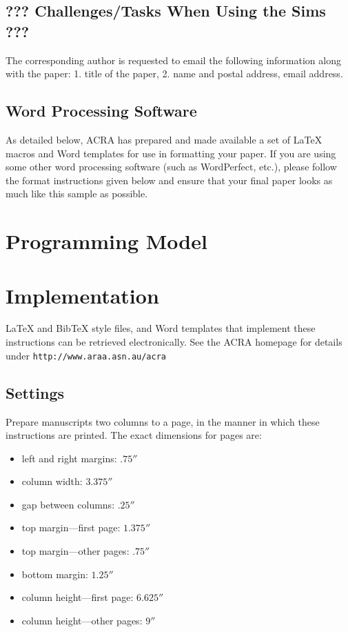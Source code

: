 \documentclass{article}
\begin{document}
\subsection{??? Challenges/Tasks When Using the Sims ???} 
The corresponding author is requested to email the following
information along with the paper: 1. title of the paper, 
2. name and postal address, email address.

\subsection{Word Processing Software}

As detailed below, ACRA has prepared and made available a set of
\LaTeX{} macros and Word templates for use in formatting your paper.
If you are using some other word processing software (such as
WordPerfect, etc.), please follow the format instructions given below
and ensure that your final paper looks as much like this sample as
possible.

\section{Programming Model}


\section{Implementation}

\LaTeX{} and Bib\TeX{} style files, and Word templates that implement these 
instructions can be retrieved electronically.  See the ACRA homepage for 
details under
\verb+http://www.araa.asn.au/acra+

\subsection{Settings}

Prepare manuscripts two columns to a page, in the manner in which these
instructions are printed.  The exact dimensions for pages are:
\begin{itemize}
\item left and right margins: $.75''$
\item column width: $3.375''$
\item gap between columns: $.25''$
\item top margin---first page: $1.375''$
\item top margin---other pages: $.75''$
\item bottom margin: $1.25''$
\item column height---first page: $6.625''$
\item column height---other pages: $9''$
\end{itemize}
\end{document}
